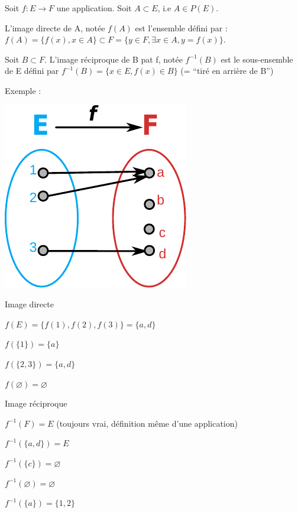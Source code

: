 \documentclass[french]{yLectureNote}
\begin{document}


\begin{theorem}[Définitions]
Soit $f:E \rightarrow F$ une application. Soit $A\subset E$, i.e $A\in P(E)$.

L'image directe de A, notée $f(A)$ est l'ensemble défini par : $f(A) = \{f(x),x\in A\} \subset F = \{y\in F, \exists x\in A, y=f(x)\}$.

Soit $B\subset F$. L'image réciproque de B pat f, notée $f^{-1}(B)$ est le sous-ensemble de E défini par $f^{-1}(B)=\{x\in E, f(x)\in B\}$ (= ``tiré en arrière de B'')
\end{theorem}
Exemple :

\includegraphics[scale=0.8]{app-ex}

Image directe

$f(E) = \{f(1),f(2),f(3)\} = \{a,d\}$

$f(\{1\}) = \{a\}$

$f(\{2,3\}) = \{a,d\}$

$f(\varnothing) = \varnothing$

Image réciproque

$f^{-1}(F) = E$ (toujours vrai, définition m\^eme d'une application)

$f^{-1}(\{a,d\}) = E$

$f^{-1}(\{c\}) = \varnothing$

$f^{-1}(\varnothing) = \varnothing$

$f^{-1}(\{a\}) = \{1,2\}$

\end{document}
